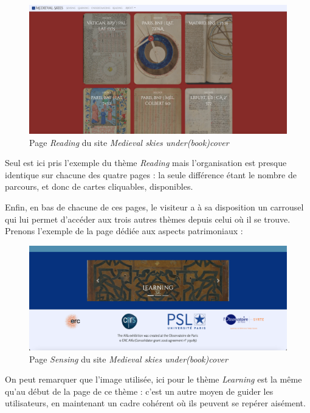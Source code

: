     \begin{figure}[h]
	\caption{Page \textit{Reading} du site \textit{Medieval skies under(book)cover}}
	\includegraphics[scale=0.3, angle=0]{images/partie3/website/expo-reading-cards.png}
    \centering
    \end{figure}
    
    Seul est ici pris l'exemple du thème \textit{Reading} mais l'organisation est presque identique sur chacune des quatre pages : la seule différence étant le nombre de parcours, et donc de cartes cliquables, disponibles.
    
    Enfin, en bas de chacune de ces pages, le visiteur a à sa disposition un carrousel qui lui permet d'accéder aux trois autres thèmes depuis celui où il se trouve.  Prenons l'exemple de la page dédiée aux aspects patrimoniaux :
    
    \begin{figure}[h]
	\caption{Page \textit{Sensing} du site \textit{Medieval skies under(book)cover}}
	\includegraphics[scale=0.3, angle=0]{images/partie3/website/expo-sensing-carrousel.png}
    \centering
    \end{figure}
    
    On peut remarquer que l'image utilisée, ici pour le thème \textit{Learning} est la même qu'au début de la page de ce thème : c'est un autre moyen de guider les utilisateurs, en maintenant un cadre cohérent où ils peuvent se repérer aisément. 
    
